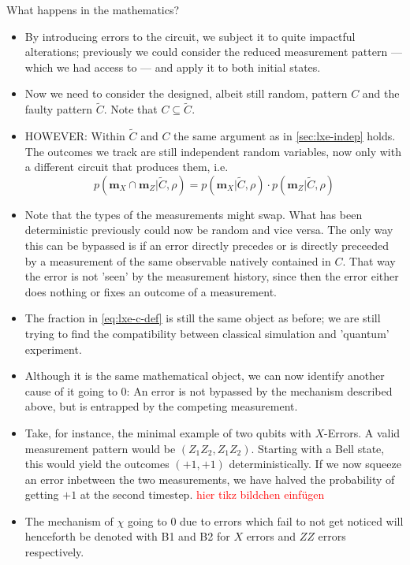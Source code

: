 \par{What happens in the mathematics?}
\begin{itemize}
  \item By introducing errors to the circuit, we subject it to quite impactful
    alterations; previously we could consider the reduced measurement
    pattern --- which we had access to --- and apply it to both initial states.
  \item Now we need to consider the designed, albeit still random, pattern $C$
    and the faulty pattern $\tilde{C}$. Note that $C\subseteq\tilde{C}$.
  \item HOWEVER: Within $\tilde{C}$ and $C$ the same argument as in
    \cref{sec:lxe-indep} holds. The outcomes we track are still independent
    random variables, now only with a different circuit that produces them,
    i.e. \[ p(\mathbf{m}_X \cap \mathbf{m}_Z | \tilde{C}, \rho) = 
    p(\mathbf{m}_X | \tilde{C}, \rho)\cdot p(\mathbf{m}_Z | \tilde{C}, \rho) \]
  \item Note that the types of the measurements might swap. What has been
    deterministic previously could now be random and vice versa. The only way
    this can be bypassed is if an error directly precedes or is directly preceeded by a
    measurement of the same observable natively contained in $C$. That way the
    error is not 'seen' by the measurement history, since then the error either
    does nothing or fixes an outcome of a measurement.
  \item The fraction in \cref{eq:lxe-c-def} is still the same object as before;
    we are still trying to find the compatibility between classical simulation
    and 'quantum' experiment.  
  \item Although it is the same mathematical object, we can now identify another
    cause of it going to $0$: An error is not bypassed by the mechanism
    described above, but is entrapped by the competing measurement.
  \item Take, for instance, the minimal example of two qubits with $X$-Errors.
    A valid measurement pattern would be $(Z_1Z_2, Z_1Z_2)$. Starting with a
    Bell state, this would yield the outcomes $(+1, +1)$ deterministically. If
    we now squeeze an error inbetween the two measurements, we have halved the
    probability of getting $+1$ at the second timestep. \textcolor{red}{hier
    tikz bildchen einf\"ugen}
    \item The mechanism of $\chi$ going to $0$ due to errors which fail to not 
    get noticed will henceforth be denoted with \textsf{B1} and \textsf{B2} for
    $X$ errors and $ZZ$ errors respectively.
\end{itemize}

